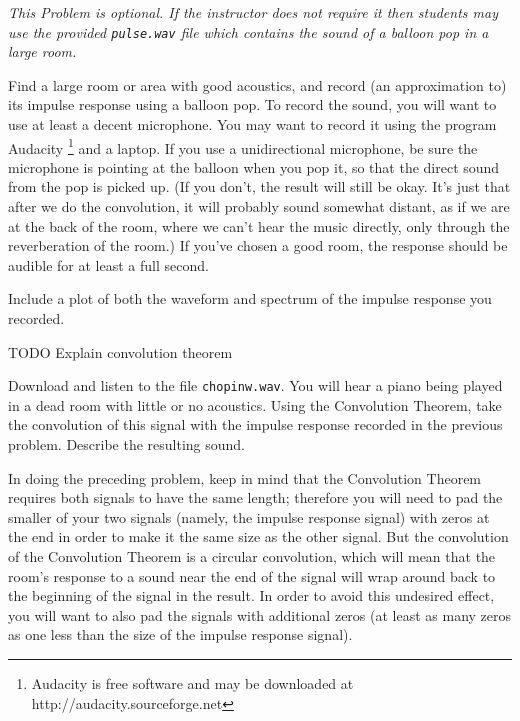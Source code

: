 \begin{problem}
\emph{This Problem is optional.  If the instructor does not require it then students may use the provided \texttt{pulse.wav} file which contains the sound of a balloon pop in a large room.}

Find a large room or area with good acoustics, and record (an approximation to) its impulse response using a balloon pop. To record the sound, you will want to use at least a decent microphone. You may want to record it using the program Audacity \footnote{Audacity is free software and may be downloaded at http://audacity.sourceforge.net} and a laptop. If you use a unidirectional microphone, be sure the microphone is pointing at the balloon when you pop it, so that the direct sound from the pop is picked up. (If you don't, the result will still be okay. It's just that after we do the convolution, it will probably sound somewhat distant, as if we are at the back of the room, where we can't hear the music directly, only through the reverberation of the room.)
If you've chosen a good room, the response should be audible for at least a full second.

Include a plot of both the waveform and spectrum of the impulse response you recorded.
\end{problem}

TODO Explain convolution theorem
\begin{problem}\label{convolution_problem}
Download and listen to the file \texttt{chopinw.wav}. You will hear a piano being played in a dead room with little or no acoustics. Using the Convolution Theorem, take the convolution of this signal with the impulse response recorded in the previous problem. Describe the resulting sound.
\end{problem}

In doing the preceding problem, keep in mind that the Convolution Theorem requires both signals to have the same length; therefore you will need to pad the smaller of your two signals (namely, the impulse response signal) with zeros at the end in order to make it the same size as the other signal. But the convolution of the Convolution Theorem is a circular convolution, which will mean that the room's response to a sound near the end of the signal will wrap around back to the beginning of the signal in the result. In order to avoid this undesired effect, you will want to also pad the signals with additional zeros (at least as many zeros as one less than the size of the impulse response signal).

